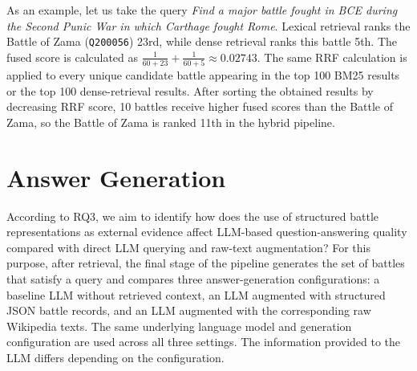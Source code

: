 As an example, let us take the query \textit{Find a major battle fought in BCE during the Second Punic War in which Carthage fought Rome}. Lexical retrieval ranks the Battle of Zama (\texttt{Q200056}) 23rd, while dense retrieval ranks this battle 5th. The fused score is calculated as
$\frac{1}{60+23} + \frac{1}{60+5} \approx 0.02743$. The same RRF calculation is applied to every unique candidate battle appearing in the top 100 BM25 results or the top 100 dense-retrieval results. After sorting the obtained results by decreasing RRF score, 10 battles receive higher fused scores than the Battle of Zama, so the Battle of Zama is ranked 11th in the hybrid pipeline. 
\section{Answer Generation}
According to RQ3, we aim to identify how does the use of structured battle representations as external evidence affect LLM-based question-answering quality compared with direct LLM querying and raw-text augmentation? For this purpose, after retrieval, the final stage of the pipeline generates the set of battles that satisfy a query and compares three answer-generation configurations: a baseline LLM without retrieved context, an LLM augmented with structured JSON battle records, and an LLM augmented with the corresponding raw Wikipedia texts. The same underlying language model and generation configuration are used across all three settings. The information provided to the LLM differs depending on the configuration.

